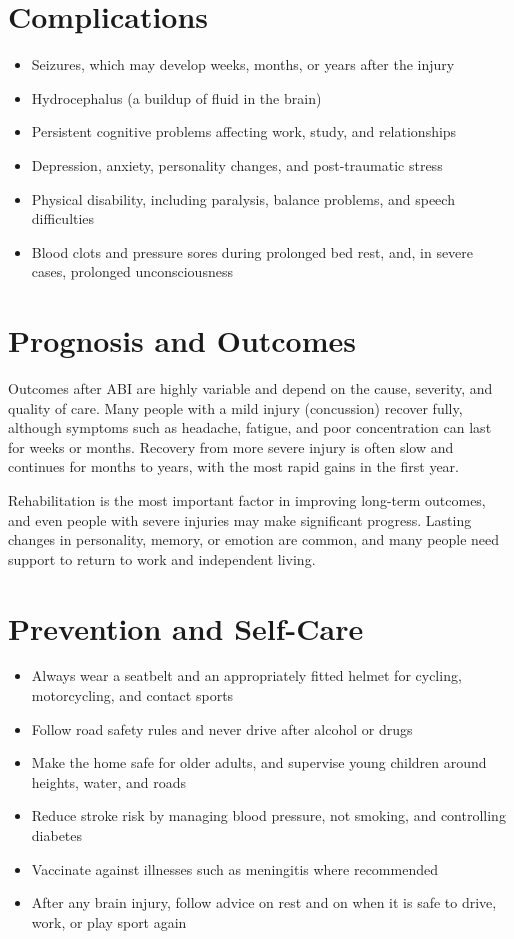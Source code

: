 \section*{Complications}
\begin{itemize}
    \item Seizures, which may develop weeks, months, or years after the injury
    \item Hydrocephalus (a buildup of fluid in the brain)
    \item Persistent cognitive problems affecting work, study, and relationships
    \item Depression, anxiety, personality changes, and post-traumatic stress
    \item Physical disability, including paralysis, balance problems, and speech difficulties
    \item Blood clots and pressure sores during prolonged bed rest, and, in severe cases, prolonged unconsciousness
\end{itemize}

\section*{Prognosis and Outcomes}
Outcomes after ABI are highly variable and depend on the cause, severity, and quality of care. Many people with a mild injury (concussion) recover fully, although symptoms such as headache, fatigue, and poor concentration can last for weeks or months. Recovery from more severe injury is often slow and continues for months to years, with the most rapid gains in the first year.

Rehabilitation is the most important factor in improving long-term outcomes, and even people with severe injuries may make significant progress. Lasting changes in personality, memory, or emotion are common, and many people need support to return to work and independent living.

\section*{Prevention and Self-Care}
\begin{itemize}
    \item Always wear a seatbelt and an appropriately fitted helmet for cycling, motorcycling, and contact sports
    \item Follow road safety rules and never drive after alcohol or drugs
    \item Make the home safe for older adults, and supervise young children around heights, water, and roads
    \item Reduce stroke risk by managing blood pressure, not smoking, and controlling diabetes
    \item Vaccinate against illnesses such as meningitis where recommended
    \item After any brain injury, follow advice on rest and on when it is safe to drive, work, or play sport again
\end{itemize}

